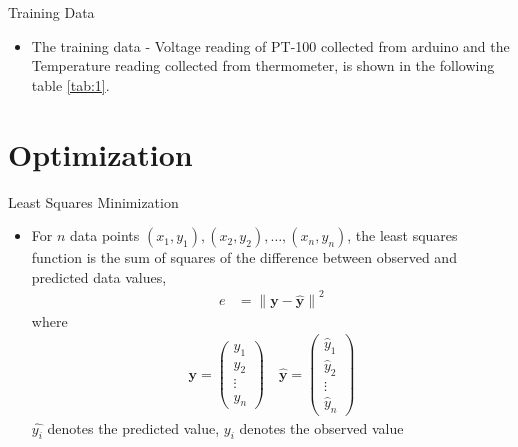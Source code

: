\documentclass[10pt]{beamer}
\renewcommand{\vec}[1]{\boldsymbol{\mathbf{#1}}}
\newcommand{\myvec}[1]{\ensuremath{\begin{pmatrix}#1\end{pmatrix}}}
\providecommand{\norm}[1]{\left\lVert#1\right\rVert}
\begin{document}
\begin{frame}{Training Data}
\begin{itemize}
\item The training data - Voltage reading of PT-100 collected from arduino and the Temperature reading collected from thermometer,  is shown in the following table \ref{tab:1}.

\begin{table}[h]
    \centering
    
    \caption{Training Data}
  	\label{tab:1}
\end{table}
\end{itemize}
\end{frame}


\section{Optimization}
\begin{frame}{Least Squares Minimization}
	\begin{itemize}
	\item For $n$ data points $(x_1, y_1), (x_2, y_2), \ldots,(x_n, y_n)$, the least squares function is the sum of squares of the difference between observed and predicted data values, \\ 
	\begin{align}
		e &= \norm{\vec{y} - \vec{\hat{y}}}^2
	\end{align}
	where
	\begin{align}
		\vec{y} = \myvec{y_1 \\ y_2 \\ \vdots\\ y_n} \quad 
	\vec{\hat{y}} = \myvec{\hat{y}_{1} \\ \hat{y}_{2} \\ \vdots\\ \hat{y}_{n}}
	\end{align}
	$\hat{y_i}$ denotes the predicted value,
    ${y_i}$ denotes the observed value
	\end{itemize}
\end{frame}
\end{document}
